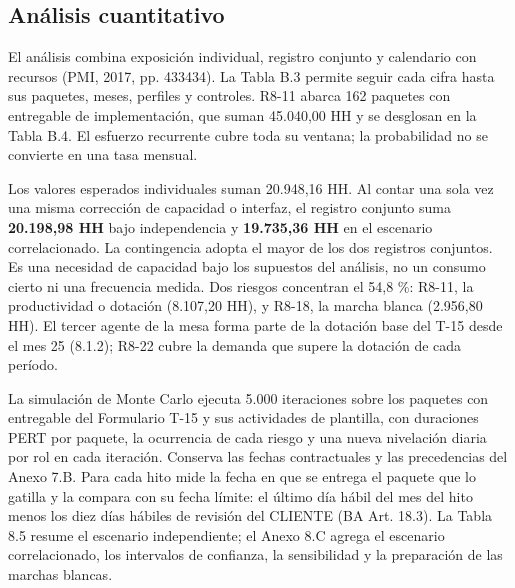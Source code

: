\subsection{Análisis cuantitativo}

El análisis combina exposición individual, registro conjunto y calendario con recursos (PMI, 2017, pp. 433\textendash{}434). La Tabla B.3 permite seguir cada cifra hasta sus paquetes, meses, perfiles y controles. R8-11 abarca 162 paquetes con entregable de implementación, que suman 45.040,00 HH y se desglosan en la Tabla B.4. El esfuerzo recurrente cubre toda su ventana; la probabilidad no se convierte en una tasa mensual.

Los valores esperados individuales suman 20.948,16 HH. Al contar una sola vez una misma corrección de capacidad o interfaz, el registro conjunto suma \textbf{20.198,98 HH} bajo independencia y \textbf{19.735,36 HH} en el escenario correlacionado. La contingencia adopta el mayor de los dos registros conjuntos. Es una necesidad de capacidad bajo los supuestos del análisis, no un consumo cierto ni una frecuencia medida. Dos riesgos concentran el 54,8 \%: R8-11, la productividad o dotación (8.107,20 HH), y R8-18, la marcha blanca (2.956,80 HH). El tercer agente de la mesa forma parte de la dotación base del T-15 desde el mes 25 (8.1.2); R8-22 cubre la demanda que supere la dotación de cada período.

La simulación de Monte Carlo ejecuta 5.000 iteraciones sobre los paquetes con entregable del Formulario T-15 y sus actividades de plantilla, con duraciones PERT por paquete, la ocurrencia de cada riesgo y una nueva nivelación diaria por rol en cada iteración. Conserva las fechas contractuales y las precedencias del Anexo 7.B. Para cada hito mide la fecha en que se entrega el paquete que lo gatilla y la compara con su fecha límite: el último día hábil del mes del hito menos los diez días hábiles de revisión del CLIENTE (BA Art. 18.3). La Tabla 8.5 resume el escenario independiente; el Anexo 8.C agrega el escenario correlacionado, los intervalos de confianza, la sensibilidad y la preparación de las marchas blancas.

